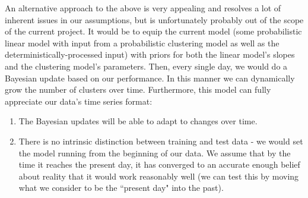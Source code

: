 An alternative approach to the above is very appealing and resolves a lot of inherent issues in our assumptions, but is unfortunately probably out of the scope of the current project. It would be to equip the current model (some probabilistic linear model with input from a probabilistic clustering model as well as the deterministically-processed input) with priors for both the linear model's slopes and the clustering model's parameters. Then, every single day, we would do a Bayesian update based on our performance. In this manner we can dynamically grow the number of clusters over time. Furthermore, this model can fully appreciate our data's time series format:
\begin{enumerate}
\item The Bayesian updates will be able to adapt to changes over time.
\item There is no intrinsic distinction between training and test data - we would set the model running from the beginning of our data. We assume that by the time it reaches the present day, it has converged to an accurate enough belief about reality that it would work reasonably well (we can test this by moving what we consider to be the ``present day" into the past).
\end{enumerate}